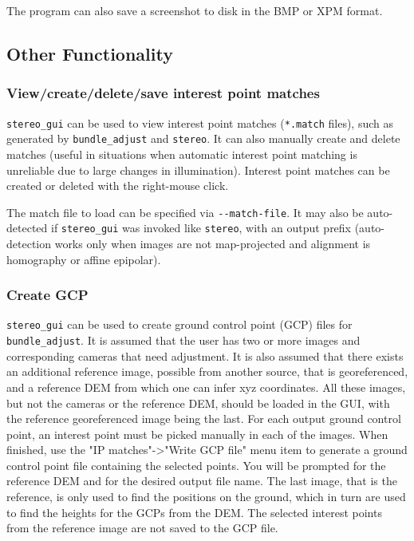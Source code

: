 The program can also save a screenshot to disk in the BMP or XPM format. 

\subsection{Other Functionality}

\subsubsection{View/create/delete/save interest point matches}

\texttt{stereo\_gui} can be used to view interest point matches
(\texttt{*.match} files), such as generated by \texttt{bundle\_adjust}
and \texttt{stereo}. It can also manually create and delete matches
(useful in situations when automatic interest point matching is
unreliable due to large changes in illumination). Interest point matches
can be created or deleted with the right-mouse click.

The match file to load can be specified via \texttt{-\/-match-file}.  It
may also be auto-detected if \texttt{stereo\_gui} was invoked like
\texttt{stereo}, with an output prefix (auto-detection works only when
images are not map-projected and alignment is homography or affine
epipolar).

\subsubsection{Create GCP}
\label{bagcp}

\texttt{stereo\_gui} can be used to create
ground control point (GCP) files for \texttt{bundle\_adjust}. It is
assumed that the user has two or more images and corresponding cameras
that need adjustment. It is also assumed that there exists an additional
reference image, possible from another source, that is georeferenced,
and a reference DEM from which one can infer xyz coordinates. All these
images, but not the cameras or the reference DEM, should be loaded in the
GUI, with the reference georeferenced image being the last. For each
output ground control point, an interest point must be picked manually
in each of the images. When finished, use the "IP matches"->"Write GCP
file" menu item to generate a ground control point file containing the
selected points.  You will be prompted for the reference DEM and for the
desired output file name. The last image, that is the reference, is only
used to find the positions on the ground, which in turn are used to find
the heights for the GCPs from the DEM. The selected interest points from
the reference image are not saved to the GCP file.

